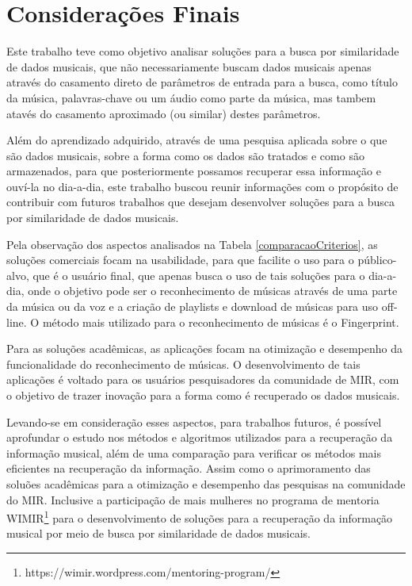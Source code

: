 \chapter{Considerações Finais} \label{cap:consideracoes-finais}

Este trabalho teve como objetivo analisar soluções para a busca por similaridade de dados musicais, que não necessariamente buscam dados musicais apenas através do casamento direto de parâmetros de entrada para a busca, como título da música, palavras-chave ou um áudio como parte da música, mas tambem atavés do casamento aproximado (ou similar) destes parâmetros.

Além do aprendizado adquirido, através de uma pesquisa aplicada sobre o que são dados musicais, sobre a forma como os dados são tratados e como são armazenados, para que posteriormente possamos recuperar essa informação e ouví-la no dia-a-dia, este trabalho buscou reunir informações com o propósito de contribuir com futuros trabalhos que desejam desenvolver soluções para a busca por similaridade de dados musicais.

Pela observação dos aspectos analisados na Tabela \ref{comparacaoCriterios}, as soluções comerciais focam na usabilidade, para que facilite o uso para o público-alvo, que é o usuário final, que apenas busca o uso de tais soluções para o dia-a-dia, onde o objetivo pode ser o reconhecimento de músicas através de uma parte da música ou da voz e a criação de playlists e download de músicas para uso off-line. O método mais utilizado para o reconhecimento de músicas é o Fingerprint.

Para as soluções acadêmicas, as aplicações focam na otimização e desempenho da funcionalidade do reconhecimento de músicas. O desenvolvimento de tais aplicações é voltado para os usuários pesquisadores da comunidade de MIR, com o objetivo de trazer inovação para a forma como é recuperado os dados musicais.

Levando-se em consideração esses aspectos, para trabalhos futuros, é possível aprofundar o estudo nos métodos e algoritmos utilizados para a recuperação da informação musical, além de uma comparação para verificar os métodos mais eficientes na recuperação da informação. Assim como o aprimoramento das soluões acadêmicas para a otimização e desempenho das pesquisas na comunidade do MIR. Inclusive a participação de mais mulheres no programa de mentoria WIMIR\footnote{https://wimir.wordpress.com/mentoring-program/} para o desenvolvimento de soluções para a recuperação da informação musical por meio de busca por similaridade de dados musicais.
